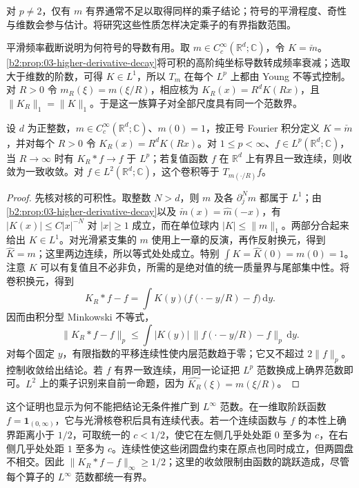 对 \(p\ne2\)，仅有 \(m\) 有界通常不足以取得同样的乘子结论；符号的平滑程度、奇性与维数会参与估计。将研究这些性质怎样决定乘子的有界指数范围。


\ProseParagraphBreak

平滑频率截断说明为何符号的导数有用。取 \(m\in C_c^\infty(\mathbb R^d;\mathbb C)\)，令 \(K=\check m\)。\cref{b2:prop:03-higher-derivative-decay}将可积的高阶纯坐标导数转成频率衰减；选取大于维数的阶数，可得 \(K\in L^1\)，所以 \(T_m\) 在每个 \(L^p\) 上都由 Young 不等式控制。对 \(R>0\) 令 \(m_R(\xi)=m(\xi/R)\)，相应核为 \(K_R(x)=R^dK(Rx)\)，且 \(\|K_R\|_1=\|K\|_1\)。于是这一族算子对全部尺度具有同一个范数界。

\begin{proposition}[平滑频率逼近]\label{b2:prop:04-smooth-frequency-approximation}
设 \(d\) 为正整数，\(m\in C_c^\infty(\mathbb R^d;\mathbb C)\)、\(m(0)=1\)，按正号 Fourier 积分定义 \(K=\check m\)，并对每个 \(R>0\) 令 \(K_R(x)=R^dK(Rx)\)。对 \(1\leq p<\infty\)、\(f\in L^p(\mathbb R^d;\mathbb C)\)，当 \(R\to\infty\) 时有 \(K_R*f\to f\) 于 \(L^p\)；若复值函数 \(f\) 在 \(\mathbb R^d\) 上有界且一致连续，则收敛为一致收敛。对 \(f\in L^2(\mathbb R^d;\mathbb C)\)，这个卷积等于 \(T_{m(\cdot/R)}f\)。
\end{proposition}
\begin{proof}
先核对核的可积性。取整数 \(N>d\)，则 \(m\) 及各 \(\partial_j^Nm\) 都属于 \(L^1\)；由\cref{b2:prop:03-higher-derivative-decay}以及 \(\check m(x)=\widehat m(-x)\)，有 \(|K(x)|\leq C|x|^{-N}\) 对 \(|x|\geq1\) 成立，而在单位球内 \(|K|\leq\|m\|_1\)。两部分合起来给出 \(K\in L^1\)。对光滑紧支集的 \(m\) 使用上一章的反演，再作反射换元，得到 \(\widehat K=m\)；这里两边连续，所以等式处处成立。特别 \(\int K=\widehat K(0)=m(0)=1\)。注意 \(K\) 可以有复值且不必非负，所需的是绝对值的统一质量界与尾部集中性。将卷积换元，得到
\[
 K_R*f-f=\int K(y)\bigl(f(\cdot-y/R)-f\bigr)\,\mathrm{d}y.
\]
因而由积分型 Minkowski 不等式，
\[
 \|K_R*f-f\|_p
 \leq\int|K(y)|\,\|f(\cdot-y/R)-f\|_p\,\mathrm{d}y.
\]
对每个固定 \(y\)，有限指数的平移连续性使内层范数趋于零；它又不超过 \(2\|f\|_p\)。控制收敛给出结论。若 \(f\) 有界一致连续，用同一论证把 \(L^p\) 范数换成上确界范数即可。\(L^2\) 上的乘子识别来自前一命题，因为 \(\widehat {K_R}(\xi)=m(\xi/R)\)。
\end{proof}

这个证明也显示为何不能把结论无条件推广到 \(L^\infty\) 范数。在一维取阶跃函数 \(f=\mathbf1_{(0,\infty)}\)，它与光滑核卷积后具有连续代表。若一个连续函数与 \(f\) 的本性上确界距离小于 \(1/2\)，可取统一的 \(c<1/2\)，使它在左侧几乎处处距 \(0\) 至多为 \(c\)，在右侧几乎处处距 \(1\) 至多为 \(c\)。连续性使这些闭圆盘约束在原点也同时成立，但两圆盘不相交。因此 \(\|K_R*f-f\|_\infty\geq1/2\)；这里的收敛限制由函数的跳跃造成，尽管每个算子的 \(L^\infty\) 范数都统一有界。

